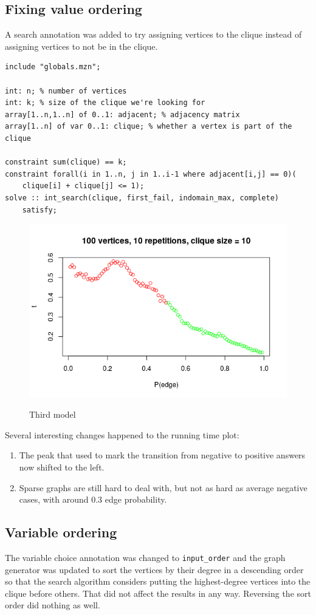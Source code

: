 \documentclass{article}
\begin{document}
\subsection{Fixing value ordering}
A search annotation was added to try assigning vertices to the clique instead of assigning vertices to not be in the clique.
\begin{lstlisting}
include "globals.mzn";

int: n; % number of vertices
int: k; % size of the clique we're looking for
array[1..n,1..n] of 0..1: adjacent; % adjacency matrix
array[1..n] of var 0..1: clique; % whether a vertex is part of the clique

constraint sum(clique) == k;
constraint forall(i in 1..n, j in 1..i-1 where adjacent[i,j] == 0)(
    clique[i] + clique[j] <= 1);
solve :: int_search(clique, first_fail, indomain_max, complete)
    satisfy;
\end{lstlisting}
\begin{figure}
  \includegraphics[scale=0.5]{max_clique3.png}
  \label{fig:third_max_clique}
  \caption{Third model}
\end{figure}
Several interesting changes happened to the running time plot:
\begin{enumerate}
\item The peak that used to mark the transition from negative to positive answers now shifted to the left.
\item Sparse graphs are still hard to deal with, but not as hard as average negative cases, with around 0.3 edge probability.
\end{enumerate}
\subsection{Variable ordering}
The variable choice annotation was changed to \texttt{input\_order} and the graph generator was updated to sort the vertices by their degree in a descending order so that the search algorithm considers putting the highest-degree vertices into the clique before others. That did not affect the results in any way. Reversing the sort order did nothing as well.
\end{document}
